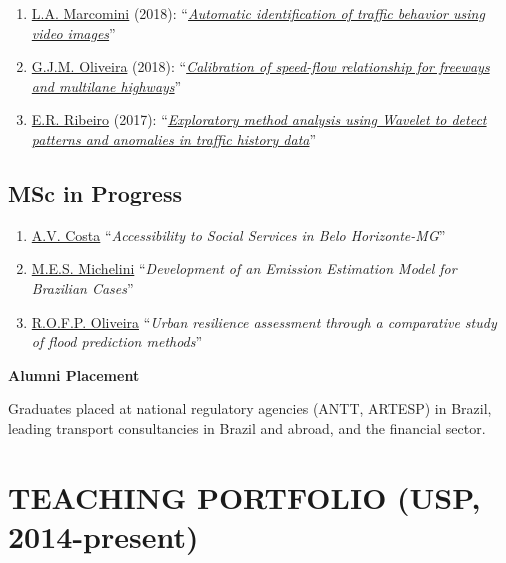 \documentclass[
  10pt,
  a4paper,
  DIV=11,
  numbers=noendperiod]{scrartcl}
\begin{document}
\begin{enumerate}
  \href{https://lattes.cnpq.br/9374994847060943}{M.M. Thebit} (2018):
  ``\emph{\href{https://doi.org/10.11606/D.18.2018.tde-10122018-225948}{Reconstruction
  of a synthetic O/D matrix using traffic data available on the web}}''
\item
  \href{https://lattes.cnpq.br/3128200022537201}{L.A. Marcomini} (2018):
  ``\emph{\href{https://doi.org/10.11606/D.18.2018.tde-01102018-102649}{Automatic
  identification of traffic behavior using video images}}''
\item
  \href{https://lattes.cnpq.br/1828432370828925}{G.J.M. Oliveira}
  (2018):
  ``\emph{\href{https://doi.org/10.11606/D.18.2018.tde-10092018-150848}{Calibration
  of speed-flow relationship for freeways and multilane highways}}''
\item
  \href{https://lattes.cnpq.br/4988917064689096}{E.R. Ribeiro} (2017):
  ``\emph{\href{https://doi.org/10.11606/D.18.2017.tde-07112017-212156}{Exploratory
  method analysis using Wavelet to detect patterns and anomalies in
  traffic history data}}''
\end{enumerate}

\subsection{MSc in Progress}\label{msc-in-progress}

\begin{enumerate}
\def\labelenumi{\arabic{enumi}.}
\item
  \href{http://lattes.cnpq.br/7862988333397510}{A.V. Costa}
  ``\emph{Accessibility to Social Services in Belo Horizonte-MG}''
\item
  \href{http://lattes.cnpq.br/6355612958124418}{M.E.S. Michelini}
  ``\emph{Development of an Emission Estimation Model for Brazilian
  Cases}''
\item
  \href{http://lattes.cnpq.br/3660336154224847}{R.O.F.P. Oliveira}
  ``\emph{Urban resilience assessment through a comparative study of
  flood prediction methods}''
\end{enumerate}

\textbf{Alumni Placement}

Graduates placed at national regulatory agencies (ANTT, ARTESP) in
Brazil, leading transport consultancies in Brazil and abroad, and the
financial sector.

\hrulefill

\section{TEACHING PORTFOLIO (USP,
2014-present)}\label{teaching-portfolio-usp-2014-present}
\end{document}
